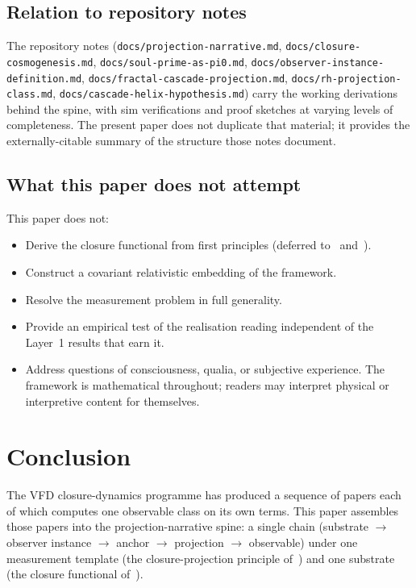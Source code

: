 \documentclass[12pt]{article}
\begin{document}
\subsection{Relation to repository notes}

The repository notes (\texttt{docs/projection-narrative.md}, \texttt{docs/closure-cosmogenesis.md}, \texttt{docs/soul-prime-as-pi0.md}, \texttt{docs/observer-instance-definition.md}, \texttt{docs/fractal-cascade-projection.md}, \texttt{docs/rh-projection-class.md}, \texttt{docs/cascade-helix-hypothesis.md}) carry the working derivations behind the spine, with sim verifications and proof sketches at varying levels of completeness. The present paper does not duplicate that material; it provides the externally-citable summary of the structure those notes document.

\subsection{What this paper does not attempt}

This paper does not:
\begin{itemize}
    \item Derive the closure functional from first principles (deferred to~\citep{SmartXXXII} and~\citep{SmartXXXVI}).
    \item Construct a covariant relativistic embedding of the framework.
    \item Resolve the measurement problem in full generality.
    \item Provide an empirical test of the realisation reading independent of the Layer~1 results that earn it.
    \item Address questions of consciousness, qualia, or subjective experience. The framework is mathematical throughout; readers may interpret physical or interpretive content for themselves.
\end{itemize}

\section{Conclusion}\label{sec:conclusion}

The VFD closure-dynamics programme has produced a sequence of papers each of which computes one observable class on its own terms. This paper assembles those papers into the projection-narrative spine: a single chain (substrate $\to$ observer instance $\to$ anchor $\to$ projection $\to$ observable) under one measurement template (the closure-projection principle of~\citep{SmartXXXIII}) and one substrate (the closure functional of~\citep{SmartXXXVI}).
\end{document}
